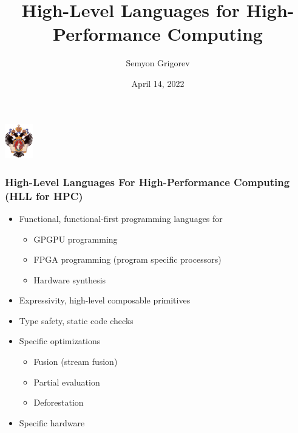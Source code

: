 \documentclass[xcolor=table,aspectratio=169]{beamer}
\title[HLL for HPC]{High-Level Languages for High-Performance Computing}
\institute[PL\&T@SPbSU]{
Saint Petersburg State University
}
\author[Semyon Grigorev]{Semyon Grigorev}
\date{April 14, 2022}
\begin{document}
{
\begin{frame}[fragile]
  \begin{table}
  \centering
  \includegraphics[height=1.5cm]{pictures/SPbGU_Logo.png}
  \end{table}
  \titlepage
\end{frame}
}

\begin{frame}[fragile]
  \frametitle{High-Level Languages For High-Performance Computing (HLL for HPC)}
  
  \begin{itemize}
    \item Functional, functional-first programming languages for 
    \begin{itemize}
      \item GPGPU programming
      \item FPGA programming (program specific processors)
      \item Hardware synthesis
    \end{itemize}  
    \pause  
    \item Expressivity, high-level composable primitives 
    \item Type safety, static code checks
    \item Specific optimizations
    \begin{itemize}
      \item Fusion (stream fusion)
      \item Partial evaluation
      \item Deforestation
    \end{itemize}   
    \pause
    \item Specific hardware
  \end{itemize}
\end{frame}
\end{document}
